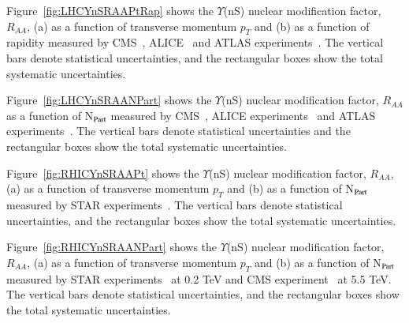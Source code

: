 Figure~\ref{fig:LHCYnSRAAPtRap} shows
    the $\Upsilon$(nS) nuclear modification factor, $R_{AA}$, (a) as a function of transverse momentum $p_{T}$
    and (b) as a function of rapidity measured by CMS~\cite{CMS:2018zza}, ALICE~\cite{ALICE:2020wwx}
    and ATLAS experiments~\cite{ALICE:2020wwx}.
    The vertical bars denote statistical uncertainties, and the rectangular boxes show the total systematic uncertainties.

Figure~\ref{fig:LHCYnSRAANPart} shows
  the $\Upsilon$(nS) nuclear modification factor, $R_{AA}$ as a function of N$_{\rm Part}$
    measured by CMS~\cite{CMS:2018zza}, ALICE experiments~\cite{ALICE:2020wwx} and ATLAS experiments~\cite{ALICE:2020wwx}.
    The vertical bars denote statistical uncertainties and the rectangular boxes show the total systematic uncertainties.

Figure~\ref{fig:RHICYnSRAAPt} shows
  the $\Upsilon$(nS) nuclear modification factor, $R_{AA}$, (a) as a function of transverse momentum $p_{T}$
    and (b) as a function of N$_{\rm Part}$ measured by STAR experiments~\cite{Wang:2019vau}. The vertical bars denote
    statistical uncertainties, and the rectangular boxes show the total systematic uncertainties.


Figure~\ref{fig:RHICYnSRAANPart} shows
  the $\Upsilon$(nS) nuclear modification factor, $R_{AA}$, (a) as a function of transverse momentum $p_{T}$
  and (b) as a function of N$_{\rm Part}$ measured by STAR experiments~\cite{Wang:2019vau} at 0.2 TeV and
  CMS experiment~\cite{CMS:2018zza} at 5.5 TeV. The vertical bars denote statistical uncertainties, and the
  rectangular boxes show the total systematic uncertainties.





